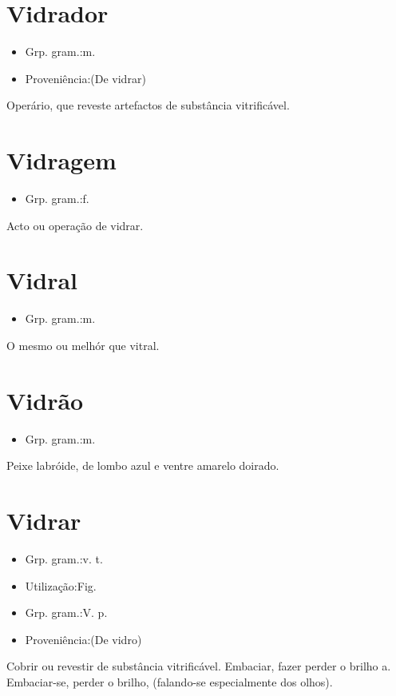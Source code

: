 \documentclass{article}
\begin{document}
\section{Vidrador}
\begin{itemize}
\item {Grp. gram.:m.}
\end{itemize}
\begin{itemize}
\item {Proveniência:(De \textunderscore vidrar\textunderscore )}
\end{itemize}
Operário, que reveste artefactos de substância vitrificável.
\section{Vidragem}
\begin{itemize}
\item {Grp. gram.:f.}
\end{itemize}
Acto ou operação de vidrar.
\section{Vidral}
\begin{itemize}
\item {Grp. gram.:m.}
\end{itemize}
O mesmo ou melhór que \textunderscore vitral\textunderscore .
\section{Vidrão}
\begin{itemize}
\item {Grp. gram.:m.}
\end{itemize}
Peixe labróide, de lombo azul e ventre amarelo doirado.
\section{Vidrar}
\begin{itemize}
\item {Grp. gram.:v. t.}
\end{itemize}
\begin{itemize}
\item {Utilização:Fig.}
\end{itemize}
\begin{itemize}
\item {Grp. gram.:V. p.}
\end{itemize}
\begin{itemize}
\item {Proveniência:(De \textunderscore vidro\textunderscore )}
\end{itemize}
Cobrir ou revestir de substância vitrificável.
Embaciar, fazer perder o brilho a.
Embaciar-se, perder o brilho, (falando-se especialmente dos olhos).
\end{document}
